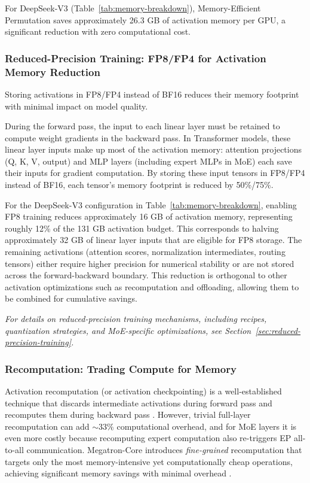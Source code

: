 \documentclass[10pt,logo,copyright]{nvidiatechreport}
\begin{document}
For DeepSeek-V3 (Table~\ref{tab:memory-breakdown}), Memory-Efficient Permutation saves approximately 26.3 GB of activation memory per GPU, a significant reduction with zero computational cost.

\subsubsection{Reduced-Precision Training: FP8/FP4 for Activation Memory Reduction}\label{sec:fp8-activation}

Storing activations in FP8/FP4 instead of BF16 reduces their memory footprint with minimal impact on model quality.

During the forward pass, the input to each linear layer must be retained to compute weight gradients in the backward pass. In Transformer models, these linear layer inputs make up most of the activation memory: attention projections (Q, K, V, output) and MLP layers (including expert MLPs in MoE) each save their inputs for gradient computation. By storing these input tensors in FP8/FP4 instead of BF16, each tensor's memory footprint is reduced by 50\%/75\%.

For the DeepSeek-V3 configuration in Table~\ref{tab:memory-breakdown}, enabling FP8 training reduces approximately 16 GB of activation memory, representing roughly 12\% of the 131 GB activation budget. This corresponds to halving approximately 32 GB of linear layer inputs that are eligible for FP8 storage. The remaining activations (attention scores, normalization intermediates, routing tensors) either require higher precision for numerical stability or are not stored across the forward-backward boundary. This reduction is orthogonal to other activation optimizations such as recomputation and offloading, allowing them to be combined for cumulative savings.

\textit{For details on reduced-precision training mechanisms, including recipes, quantization strategies, and MoE-specific optimizations, see Section~\ref{sec:reduced-precision-training}.}

\subsubsection{Recomputation: Trading Compute for Memory}\label{sec:recomputation}

Activation recomputation (or activation checkpointing) is a well-established technique that discards intermediate activations during forward pass and recomputes them during backward pass \cite{chen2016training}. However, trivial full-layer recomputation can add $\sim$33\% computational overhead, and for MoE layers it is even more costly because recomputing expert computation also re-triggers EP all-to-all communication. Megatron-Core introduces \textit{fine-grained} recomputation that targets only the most memory-intensive yet computationally cheap operations, achieving significant memory savings with minimal overhead \cite{korthikanti2022reducingactivationrecomputationlarge}.
\end{document}
